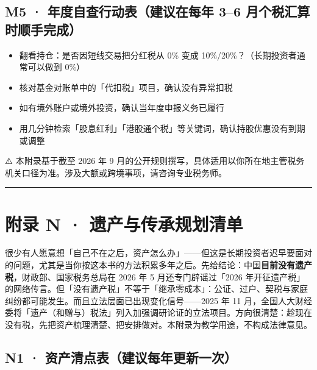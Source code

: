 \documentclass[a4paper,11pt,oneside,fontset=none,UTF8,zihao=-4]{ctexbook}
\providecommand{\tightlist}{\setlength{\itemsep}{2pt}\setlength{\parskip}{1pt}}
\begin{document}
\subsection{M5 · 年度自查行动表（建议在每年 3--6
月个税汇算时顺手完成）}\label{m5-ux5e74ux5ea6ux81eaux67e5ux884cux52a8ux8868ux5efaux8baeux5728ux6bcfux5e74-36-ux6708ux4e2aux7a0eux6c47ux7b97ux65f6ux987aux624bux5b8cux6210}

\begin{itemize}
\tightlist
\item
  翻看持仓：是否因短线交易把分红税从 0\% 变成
  10\%/20\%？（长期投资者通常可以做到 0\%）
\item
  核对基金对账单中的「代扣税」项目，确认没有异常扣税
\item
  如有境外账户或境外投资，确认当年度申报义务已履行
\item
  用几分钟检索「股息红利」「港股通个税」等关键词，确认持股优惠没有到期或调整
\end{itemize}

\begin{dhquote}
⚠️ 本附录基于截至 2026 年 9
月的公开规则撰写，具体适用以你所在地主管税务机关口径为准。涉及大额或跨境事项，请咨询专业税务师。
\end{dhquote}

\begin{center}{\color{dh-bronze}\rule{0.2\textwidth}{0.5pt}}\end{center}

\section{附录 N ·
遗产与传承规划清单}\label{ux9644ux5f55-n-ux9057ux4ea7ux4e0eux4f20ux627fux89c4ux5212ux6e05ux5355}

\begin{dhquote}
很少有人愿意想「自己不在之后，资产怎么办」------但这是长期投资者迟早要面对的问题，尤其是当你按这本书的方法积累多年之后。先给结论：中国\textbf{目前没有遗产税}，财政部、国家税务总局在
2026 年 5 月还专门辟谣过「2026
年开征遗产税」的网络传言。但「没有遗产税」不等于「继承零成本」：公证、过户、契税与家庭纠纷都可能发生。而且立法层面已出现变化信号------2025
年 11
月，全国人大财经委将「遗产（和赠与）税法」列入加强调研论证的立法项目。方向很清楚：趁现在没有税，先把资产梳理清楚、把安排做对。本附录为教学用途，不构成法律意见。
\end{dhquote}

\subsection{N1 ·
资产清点表（建议每年更新一次）}\label{n1-ux8d44ux4ea7ux6e05ux70b9ux8868ux5efaux8baeux6bcfux5e74ux66f4ux65b0ux4e00ux6b21}
\end{document}
